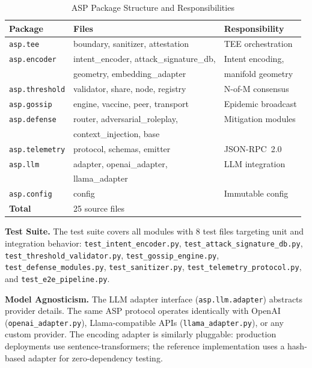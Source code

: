 \documentclass[sigconf,natbib=false]{acmart}
\begin{document}
\begin{table}[h]
\centering
\caption{ASP Package Structure and Responsibilities}
\label{tab:modules}
\small
\begin{tabular}{lll}
\toprule
\textbf{Package} & \textbf{Files} & \textbf{Responsibility} \\
\midrule
\texttt{asp.tee}      & boundary, sanitizer, attestation & TEE orchestration \\
\texttt{asp.encoder}  & intent\_encoder, attack\_signature\_db, & Intent encoding, \\
                      & geometry, embedding\_adapter          & manifold geometry \\
\texttt{asp.threshold} & validator, share, node, registry    & N-of-M consensus \\
\texttt{asp.gossip}   & engine, vaccine, peer, transport     & Epidemic broadcast \\
\texttt{asp.defense}  & router, adversarial\_roleplay,       & Mitigation modules \\
                      & context\_injection, base             & \\
\texttt{asp.telemetry} & protocol, schemas, emitter          & JSON-RPC~2.0 \\
\texttt{asp.llm}      & adapter, openai\_adapter,            & LLM integration \\
                      & llama\_adapter                       & \\
\texttt{asp.config}   & config                               & Immutable config \\
\midrule
\textbf{Total} & 25 source files & \\
\bottomrule
\end{tabular}
\end{table}

\textbf{Test Suite.}
The test suite covers all modules with 8 test files targeting unit and
integration behavior:
\texttt{test\_intent\_encoder.py},
\texttt{test\_attack\_signature\_db.py},
\texttt{test\_threshold\_validator.py},
\texttt{test\_gossip\_engine.py},
\texttt{test\_defense\_modules.py},
\texttt{test\_sanitizer.py},
\texttt{test\_telemetry\_protocol.py}, and
\texttt{test\_e2e\_pipeline.py}.

\textbf{Model Agnosticism.}
The LLM adapter interface (\texttt{asp.llm.adapter}) abstracts provider
details. The same ASP protocol operates identically with OpenAI
(\texttt{openai\_adapter.py}), Llama-compatible APIs
(\texttt{llama\_adapter.py}), or any custom provider. The encoding adapter
is similarly pluggable: production deployments use sentence-transformers;
the reference implementation uses a hash-based adapter for zero-dependency
testing.
\end{document}
